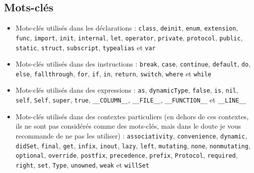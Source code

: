 \subsection{Mots-clés}

\begin{itemize}

\item Mots-clés utilisés dans les déclarations :
\texttt{class},
\texttt{deinit},
\texttt{enum},
\texttt{extension},
\texttt{func},
\texttt{import},
\texttt{init},
\texttt{internal},
\texttt{let},
\texttt{operator},
\texttt{private},
\texttt{protocol},
\texttt{public},
\texttt{static},
\texttt{struct},
\texttt{subscript},
\texttt{typealias} et
\texttt{var}

\item Mots-clés utilisés dans des instructions :
\texttt{break},
\texttt{case},
\texttt{continue},
\texttt{default},
\texttt{do},
\texttt{else},
\texttt{fallthrough},
\texttt{for},
\texttt{if},
\texttt{in},
\texttt{return},
\texttt{switch},
\texttt{where} et
\texttt{while}

\item Mots-clés utilisés dans des expressions :
\texttt{as},
\texttt{dynamicType},
\texttt{false},
\texttt{is},
\texttt{nil},
\texttt{self},
\texttt{Self},
\texttt{super},
\texttt{true},
\texttt{__COLUMN__},
\texttt{__FILE__},
\texttt{__FUNCTION__} et
\texttt{__LINE__}

\item Mots-clés utilisés dans des contextes particuliers (en dehors de ces contextes, ils ne sont pas considérés comme des mots-clés,
mais dans le doute je vous recommande de ne pas les utiliser) :
\texttt{associativity},
\texttt{convenience},
\texttt{dynamic},
\texttt{didSet},
\texttt{final},
\texttt{get},
\texttt{infix},
\texttt{inout},
\texttt{lazy},
\texttt{left},
\texttt{mutating},
\texttt{none},
\texttt{nonmutating},
\texttt{optional},
\texttt{override},
\texttt{postfix},
\texttt{precedence},
\texttt{prefix},
\texttt{Protocol},
\texttt{required},
\texttt{right},
\texttt{set},
\texttt{Type},
\texttt{unowned},
\texttt{weak} et
\texttt{willSet}
\end{itemize}

